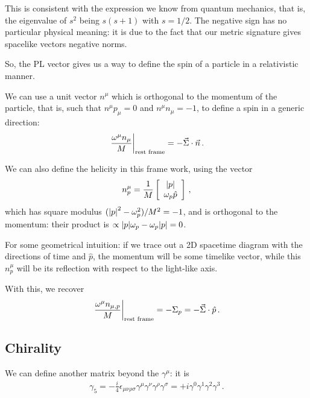\documentclass[main.tex]{subfiles}
\begin{document}
This is consistent with the expression we know from quantum mechanics, that is, the eigenvalue of \(s^2\) being \(s (s+1)\) with \(s = 1/2\).
The negative sign has no particular physical meaning: it is due to the fact that our metric signature gives spacelike vectors negative norms. 

So, the PL vector gives us a way to define the spin of a particle in a relativistic manner. 

We can use a unit vector \(n^{\mu }\) which is orthogonal to the momentum of the particle, that is, such that \(n^{\mu } p_{\mu }=0\) and \(n^{\mu } n_{\mu }=-1\), to define a spin in a generic direction: 
%
\begin{align}
\eval{\frac{\omega^{\mu }n_{\mu }}{M}}_{\text{rest frame}} = - \vec{\Sigma} \cdot \vec{n}
\,.
\end{align}

We can also define the helicity in this frame work, using the vector 
%
\begin{subequations}
\begin{align}
n^{\mu }_{p} = \frac{1}{M} \left[\begin{array}{c}
\abs{p} \\ 
\omega_{p} \hat{p}
\end{array}\right]
\,,
\end{align}
\end{subequations}
%
which has square modulus \((\abs{p}^2 - \omega_{p}^2) / M^2 = -1\), and is orthogonal to the momentum: their product is \(\propto \abs{p} \omega_{p}  - \omega_{p} \abs{p} = 0\).

For some geometrical intuition: if we trace out a 2D spacetime diagram with the directions of time and \(\hat{p}\), the momentum will be some timelike vector, while this \(n^{\mu }_{p}\) will be its reflection with respect to the light-like axis.

With this, we recover 
%
\begin{align}
\eval{\frac{\omega^{\mu }n_{\mu , p}}{M}}_{\text{rest frame}}
= - \Sigma_{p} = - \vec{\Sigma} \cdot \hat{p}
\,.
\end{align}
%
\subsection{Chirality}

We can define another matrix beyond the \(\gamma^{\mu }\): it is 
%
\begin{align} \label{eq:gamma5-definition}
\gamma_{5} = - \frac{i}{4} \epsilon_{\mu \nu \rho \sigma } \gamma^{\mu } \gamma^{\nu } \gamma^{\rho } \gamma^{\sigma } = + i \gamma^{0} \gamma^{1} \gamma^{2} \gamma^{3}
\,.
\end{align}
\end{document}
